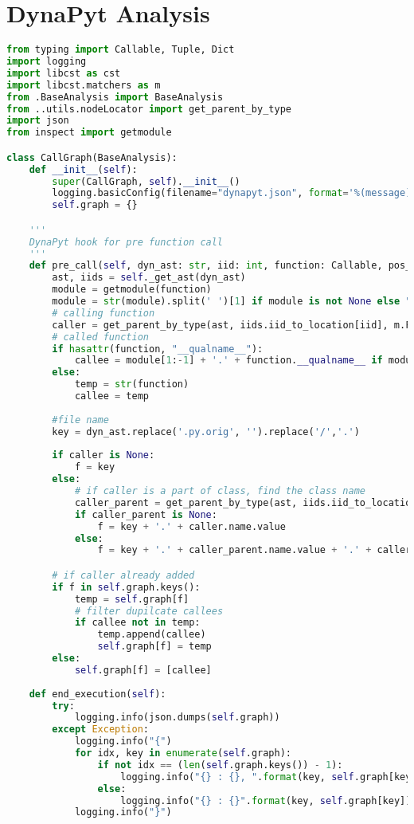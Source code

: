 \section{DynaPyt Analysis}
\lstset{numbers=left, numberstyle=\tiny, stepnumber=1, numbersep=5pt, columns=flexible, breaklines=true, numberblanklines=false}
\lstset{basicstyle=\ttfamily}
\lstset{frame=tb}

\begin{lstlisting}[caption=Call Graph Analysis in DynaPyt,label=code:CallGraphAnalysis,language=Python]
from typing import Callable, Tuple, Dict
import logging
import libcst as cst
import libcst.matchers as m
from .BaseAnalysis import BaseAnalysis
from ..utils.nodeLocator import get_parent_by_type
import json
from inspect import getmodule

class CallGraph(BaseAnalysis):
    def __init__(self):
        super(CallGraph, self).__init__()
        logging.basicConfig(filename="dynapyt.json", format='%(message)s', level=logging.INFO)
        self.graph = {}

    '''
    DynaPyt hook for pre function call
    '''
    def pre_call(self, dyn_ast: str, iid: int, function: Callable, pos_args: Tuple, kw_args: Dict):
        ast, iids = self._get_ast(dyn_ast)
        module = getmodule(function)
        module = str(module).split(' ')[1] if module is not None else "''"
        # calling function 
        caller = get_parent_by_type(ast, iids.iid_to_location[iid], m.FunctionDef())
        # called function
        if hasattr(function, "__qualname__"):
            callee = module[1:-1] + '.' + function.__qualname__ if module != "''" else function.__qualname__
        else:
            temp = str(function)
            callee = temp
        
        #file name
        key = dyn_ast.replace('.py.orig', '').replace('/','.')
        
        if caller is None:
            f = key
        else:
            # if caller is a part of class, find the class name
            caller_parent = get_parent_by_type(ast, iids.iid_to_location[iid], m.ClassDef())
            if caller_parent is None:
                f = key + '.' + caller.name.value
            else:
                f = key + '.' + caller_parent.name.value + '.' + caller.name.value

        # if caller already added
        if f in self.graph.keys():
            temp = self.graph[f]
            # filter dupilcate callees
            if callee not in temp:
                temp.append(callee)
                self.graph[f] = temp
        else:
            self.graph[f] = [callee]
    
    def end_execution(self):
        try:
            logging.info(json.dumps(self.graph))
        except Exception:
            logging.info("{")
            for idx, key in enumerate(self.graph):                
                if not idx == (len(self.graph.keys()) - 1):
                    logging.info("{} : {}, ".format(key, self.graph[key]))
                else:
                    logging.info("{} : {}".format(key, self.graph[key]))
            logging.info("}")
                
\end{lstlisting}

